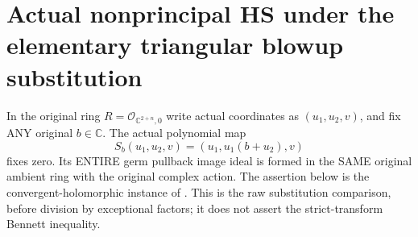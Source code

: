 \section{Actual nonprincipal HS under the elementary triangular blowup substitution}

In the original ring $R=\mathcal O_{\mathbb C^{2+n},0}$ write actual
coordinates as $(u_1,u_2,v)$, and fix ANY original $b\in\mathbb C$. The
actual polynomial map
\[
 S_b(u_1,u_2,v)=(u_1,u_1(b+u_2),v)
\]
fixes zero. Its ENTIRE germ pullback image ideal is formed in the SAME
original ambient ring with the original complex action. The assertion
below is the convergent-holomorphic instance of
\cite[Lemma 7.26, p.~270]{bierstone-milman97-invent-math}. This is the raw
substitution comparison, before division by exceptional factors; it does
not assert the strict-transform Bennett inequality.

